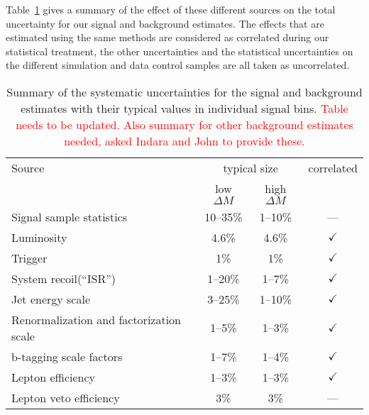 Table~\ref{tab:syst} gives a summary of the effect of these different sources on the total uncertainty for our signal and background estimates. The effects that are estimated using the same methods are considered as correlated during our statistical treatment, the other uncertainties and the statistical uncertainties on the different simulation and data control samples are all taken as uncorrelated.

\begin{table}[htb]
\centering
\caption{\label{tab:syst} Summary of the systematic uncertainties for the signal and background estimates with their typical values in individual signal bins. \textcolor{red}{Table needs to be updated.  Also summary for other background estimates needed, asked Indara and John to provide these.} }%
\begin{tabular}{lccc}%
\hline\hline
Source & \multicolumn{2}{c}{typical size} & correlated \\%
 & low $\Delta M$ & high $\Delta M$ & \\%
\hline
Signal sample statistics & 10--35\% & 1--10\% & ---  \\%
Luminosity & 4.6\% & 4.6\% & $\checkmark$  \\%
Trigger & 1\% & 1\% & $\checkmark$  \\%
System recoil(``ISR'') & 1--20\% & 1--7\% & $\checkmark$ \\%
Jet energy scale & 3--25\% & 1--10\% & $\checkmark$ \\%
Renormalization and factorization scale & 1--5\% & 1--3\% & $\checkmark$ \\%
b-tagging scale factors & 1--7\% & 1--4\% & $\checkmark$ \\%
Lepton efficiency & 1--3\% & 1--3\% & $\checkmark$ \\%
Lepton veto efficiency & 3\% & 3\% & --- \\%
\hline\hline
\end{tabular}
\end{table}
